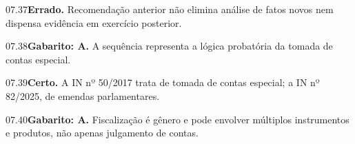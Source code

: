 \begin{solucao}{07.37}\textbf{Errado.} Recomendação anterior não elimina análise de fatos novos nem dispensa evidência em exercício posterior.\end{solucao}
\begin{solucao}{07.38}\textbf{Gabarito: A.} A sequência representa a lógica probatória da tomada de contas especial.\end{solucao}
\begin{solucao}{07.39}\textbf{Certo.} A IN nº 50/2017 trata de tomada de contas especial; a IN nº 82/2025, de emendas parlamentares.\end{solucao}
\begin{solucao}{07.40}\textbf{Gabarito: A.} Fiscalização é gênero e pode envolver múltiplos instrumentos e produtos, não apenas julgamento de contas.\end{solucao}

